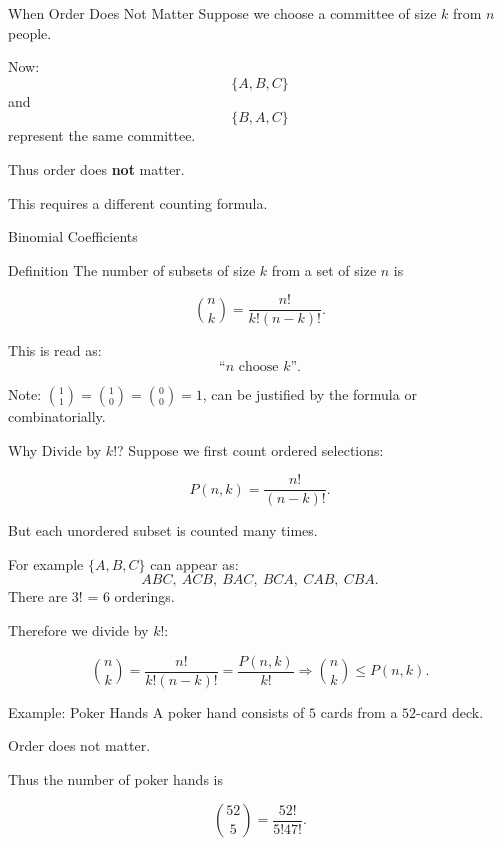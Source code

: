 \begin{frame}{When Order Does Not Matter}
Suppose we choose a committee of size $k$ from $n$ people.

\vspace{0.25cm}

Now:
\[
\{A,B,C\}
\]
and
\[
\{B,A,C\}
\]
represent the same committee.

\vspace{0.25cm}

Thus order does \textbf{not} matter.

\vspace{0.25cm}

This requires a different counting formula.
\end{frame}

\begin{frame}{Binomial Coefficients}
\begin{keybox}{Definition}
The number of subsets of size $k$ from a set of size $n$ is

\[
\binom{n}{k}
=
\frac{n!}{k!(n-k)!}.
\]
\end{keybox}

\vspace{0.25cm}

This is read as:
\[
\text{``$n$ choose $k$''}.
\]


Note: $\binom{1}{1} =  \binom{1}{0} = \binom{0}{0} =1 $, can be justified by the formula or combinatorially.
\end{frame}

\begin{frame}{Why Divide by $k!$?}
Suppose we first count ordered selections:

\[
P(n,k) = \frac{n!}{(n-k)!}.
\]

But each unordered subset is counted many times.

\vspace{0.25cm}

For example $\{A,B,C\}$
can appear as:
\[
ABC,\ ACB,\ BAC,\ BCA,\ CAB,\ CBA.
\]
There are 3! = 6  orderings.

Therefore we divide by $k!$:

\[
\binom{n}{k}
=
\frac{n!}{k!(n-k)!} = \frac{P(n,k)}{k!} \Rightarrow  \binom{n}{k} \leq P(n,k).
\]
\end{frame}

\begin{frame}{Example: Poker Hands}
A poker hand consists of $5$ cards from a $52$-card deck.

Order does not matter.

\vspace{0.25cm}

Thus the number of poker hands is

\[
\binom{52}{5}
=
\frac{52!}{5!47!}.
\]

\vspace{0.25cm}

\end{frame}

